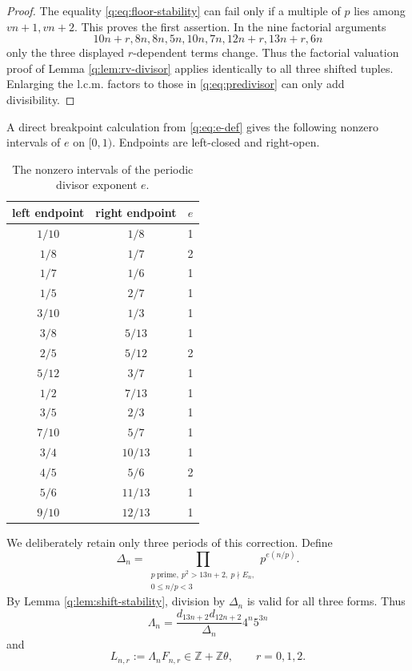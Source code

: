 \documentclass[11pt]{amsart}
\newcommand{\Z}{\mathbb Z}
\theoremstyle{plain}
\theoremstyle{remark}\newtheorem{remark}[theorem]{Remark}
\numberwithin{equation}{section}
\begin{document}
\begin{proof}
The equality \eqref{q:eq:floor-stability} can fail only if a multiple of $p$
lies among $vn+1,vn+2$.  This proves the first assertion.  In the nine
factorial arguments
\[
 10n+r,8n,8n,5n,10n,7n,12n+r,13n+r,6n
\]
only the three displayed $r$-dependent terms change.  Thus the factorial
valuation proof of Lemma \ref{q:lem:rv-divisor} applies identically to all
three shifted tuples.  Enlarging the l.c.m. factors to those in
\eqref{q:eq:predivisor} can only add divisibility.
\end{proof}

A direct breakpoint calculation from \eqref{q:eq:e-def} gives the following
nonzero intervals of $e$ on $[0,1)$.  Endpoints are left-closed and
right-open.
\begin{table}[ht]
\centering
\caption{The nonzero intervals of the periodic divisor exponent $e$.}
\label{q:tab:eintervals}
\small
\begin{tabular}{@{}ccc@{}}
\toprule
left endpoint & right endpoint & $e$\\
\midrule
$1/10$ & $1/8$ & 1\\
$1/8$ & $1/7$ & 2\\
$1/7$ & $1/6$ & 1\\
$1/5$ & $2/7$ & 1\\
$3/10$ & $1/3$ & 1\\
$3/8$ & $5/13$ & 1\\
$2/5$ & $5/12$ & 2\\
$5/12$ & $3/7$ & 1\\
$1/2$ & $7/13$ & 1\\
$3/5$ & $2/3$ & 1\\
$7/10$ & $5/7$ & 1\\
$3/4$ & $10/13$ & 1\\
$4/5$ & $5/6$ & 2\\
$5/6$ & $11/13$ & 1\\
$9/10$ & $12/13$ & 1\\
\bottomrule
\end{tabular}
\end{table}

We deliberately retain only three periods of this correction.  Define
\begin{equation}\label{q:eq:Deltan}
 \Delta_n=
 \prod_{\substack{p\ \mathrm{prime},\ p^2>13n+2,\ p\nmid E_n,\\
                   0\le n/p<3}}
 p^{e(n/p)}.
\end{equation}
By Lemma \ref{q:lem:shift-stability}, division by $\Delta_n$ is valid for all
three forms.  Thus
\begin{equation}\label{q:eq:Lambda}
 \Lambda_n=\frac{d_{13n+2}d_{12n+2}}{\Delta_n}4^n5^{3n}
\end{equation}
and
\begin{equation}\label{q:eq:integer-forms}
 L_{n,r}:=\Lambda_nF_{n,r}\in\Z+\Z\theta,
 \qquad r=0,1,2.
\end{equation}
\end{document}
